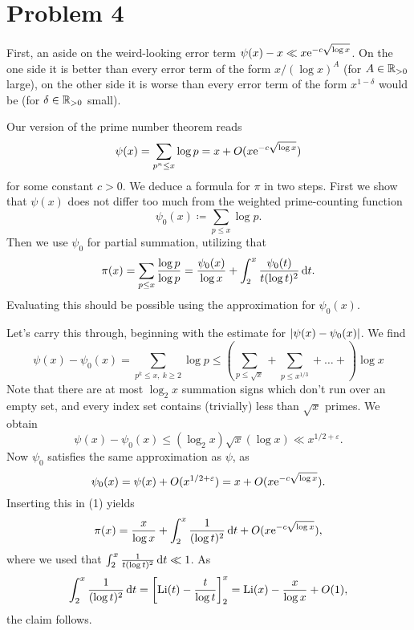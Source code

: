 \documentclass[a4paper,11pt]{article}
\begin{document}
\section*{Problem 4}
First, an aside on the weird-looking error term $\psi(x)-x \ll x \mathrm e^{-c
\sqrt{\log x}}$. On the one side it is better than every error term
of the form $x /(\log x)^A$ (for $A \in \mathbb{R}_{>0}$ large), on the other side 
it is worse than every error term of the form $x^{1-\delta}$ would be (for
$\delta \in \mathbb{R}_{>0}$ small).

Our version of the prime number theorem reads
\[
    \psi(x) = \sum_{p^n \leq x} \log p =  x + O(x\mathrm e^{-c \sqrt{\log x}})
\]
for some constant $c > 0$. We deduce a formula for $\pi$ in two steps. First we show that 
$\psi(x)$ does not differ too much from the weighted prime-counting function
\[
    \psi_0(x) \coloneqq \sum_{p \leq x} \log p.
\]
Then we use $\psi_0$ for partial summation, utilizing that
\begin{equation}
    \pi(x) = \sum_{p \leq x} \frac{\log p}{\log p} = \frac {\psi_0(x)}{\log x}
    + \int_2^x \frac{\psi_0(t)}{t (\log t)^2} \mathrm{\,d} t.
\end{equation}
Evaluating this should be possible using the approximation for $\psi_0(x)$. 

Let's carry this through, beginning with the estimate for $\left\lvert \psi(x)-\psi_0(x) \right\rvert$. 
We find
\[
    \psi(x)-\psi_0(x) = \sum_{p^k \leq x, \ k \geq 2} \log p
    \leq \left(\sum_{p \leq \sqrt x} + \sum_{p \leq x^{1/3}} + \dots + 
    \right) \log x
\]
Note that there are at most $\log_2 x$ summation signs which don't run over an
empty set,
and every index set contains (trivially) less than $\sqrt x$ primes. We obtain
\[
    \psi(x) - \psi_0(x) \leq  (\log_2 x) \sqrt x (\log x) \ll x^{1/2+\varepsilon}.
\]
Now $\psi_0$ satisfies the same approximation as $\psi$, as
\[
    \psi_0(x) = \psi(x) + O(x^{1/2+\varepsilon}) = x + O(x \mathrm e^{-c \sqrt {\log x}}).
\]
Inserting this in (1) yields
\[
    \pi(x) = \frac x{\log x} + \int_2^x \frac{1}{(\log t)^2} \mathrm{\,d} t
    + O( x \mathrm e^{-c \sqrt{\log x}}),
\]
where we used that $\int_2^x \frac{1}{t (\log t)^2} \mathrm{\,d} t \ll 1$. As
\[
    \int_2^x \frac{1}{(\log t)^2} \mathrm{\,d} t = \left[ \mathrm{Li}(t)-\frac t{\log t} \right]_2^x
    = \mathrm{Li}(x) - \frac{x}{\log x} + O(1),
\]
the claim follows. 



\contactend
\end{document}
